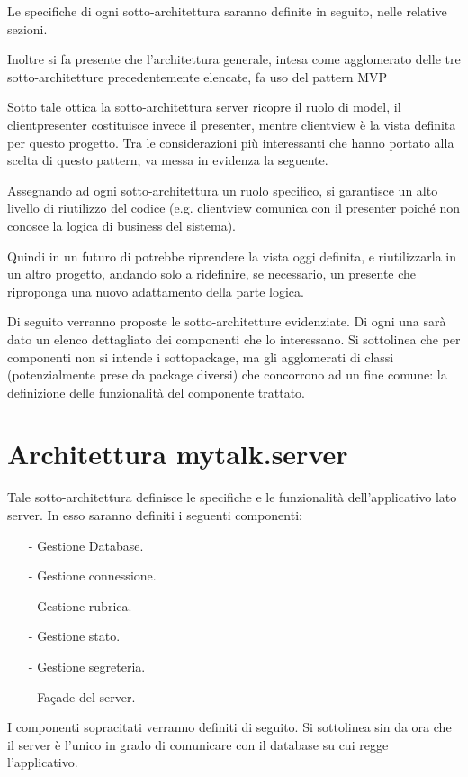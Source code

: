 Le specifiche di ogni sotto-architettura saranno definite in seguito, nelle relative sezioni.

Inoltre si fa presente che l'architettura generale, intesa come agglomerato delle tre sotto-architetture precedentemente elencate, fa uso del pattern MVP\@

Sotto tale ottica la sotto-architettura server ricopre il ruolo di model, il clientpresenter costituisce invece il presenter, mentre clientview è la vista definita per questo progetto. Tra le considerazioni più interessanti che hanno portato alla scelta di questo pattern, va messa in evidenza la seguente.

Assegnando ad ogni sotto-architettura un ruolo specifico, si garantisce un alto livello di riutilizzo del codice (e.g. clientview comunica con il presenter poiché non conosce la logica di business del sistema).

Quindi in un futuro di potrebbe riprendere la vista oggi definita, e riutilizzarla in un altro progetto, andando solo a ridefinire, se necessario, un presente che riproponga una nuovo adattamento della parte logica.

Di seguito verranno proposte le sotto-architetture evidenziate. Di ogni una sarà dato un elenco dettagliato dei componenti che lo interessano. Si sottolinea che per componenti non si intende i sottopackage, ma gli agglomerati di classi (potenzialmente prese da package diversi) che concorrono ad un fine comune: la definizione delle funzionalità del componente trattato.
\clearpage

\section{Architettura mytalk.server}
Tale sotto-architettura definisce le specifiche e le funzionalità dell'applicativo lato server. In esso saranno definiti i seguenti componenti:
\begin{itemize}[noitemsep,nolistsep]
	\item[-] Gestione Database.
	\item[-] Gestione connessione.
	\item[-] Gestione rubrica.
	\item[-] Gestione stato.
	\item[-] Gestione segreteria.
	\item[-] Façade del server.
\end{itemize}

I componenti sopracitati verranno definiti di seguito. Si sottolinea sin da ora che il server è l'unico in grado di comunicare con il database su cui regge l'applicativo.

